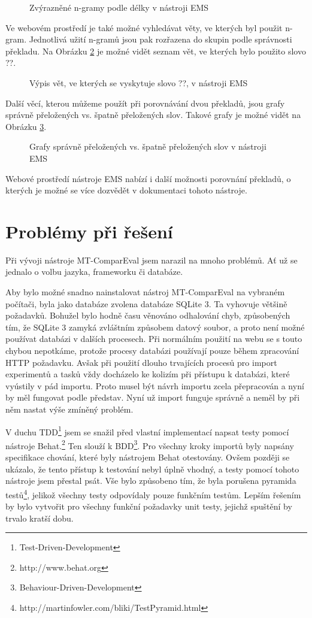 \begin{figure}
  \caption{Zvýrazněné n-gramy podle délky v nástroji EMS}
  \label{img:ems-sentence}
\end{figure}

Ve webovém prostředí je také možné vyhledávat věty,
  ve kterých byl použit n-gram.
Jednotlivá užití n-gramů jsou pak rozřazena do skupin podle správnosti překladu.
Na Obrázku \ref{img:ems-word} je možné vidět seznam vět,
  ve kterých bylo použito slovo ??.

\begin{figure}
  \caption{Výpis vět, ve kterých se vyskytuje slovo ??, v nástroji EMS}
  \label{img:ems-word}
\end{figure}

Další věcí, kterou můžeme použít při porovnávání dvou překladů,
  jsou grafy správně přeložených vs. špatně přeložených slov.
Takové grafy je možné vidět na Obrázku \ref{img:ems-charts}.

\begin{figure}
  \caption{Grafy správně přeložených vs. špatně přeložených slov v nástroji EMS}
  \label{img:ems-charts}
\end{figure}

Webové prostředí nástroje EMS nabízí i další možnosti porovnání překladů,
  o kterých je možné se více dozvědět v dokumentaci tohoto nástroje.

\section{Problémy při řešení}
Při vývoji nástroje MT-ComparEval jsem narazil na mnoho problémů.
Ať už se jednalo o volbu jazyka, frameworku či databáze.

Aby bylo možné snadno nainstalovat nástroj MT-ComparEval na vybraném počítači,
  byla jako databáze zvolena databáze SQLite 3.
Ta vyhovuje většině požadavků.
Bohužel bylo hodně času věnováno odhalování chyb,
  způsobených tím,
  že SQLite 3 zamyká zvláštním způsobem datový soubor,
  a proto není možné používat databázi v dalších procesech.
Při normálním použití na webu se s touto chybou nepotkáme,
  protože procesy databázi používají pouze během zpracování HTTP požadavku.
Avšak při použití dlouho trvajících procesů pro import experimentů a tasků
  vždy docházelo ke kolizím při přístupu k databázi,
  které vyústily v pád importu.
Proto musel být návrh importu zcela přepracován a nyní by měl fungovat podle představ.
Nyní už import funguje správně a neměl by při něm nastat výše zmíněný problém.


V duchu TDD\footnote{Test-Driven-Development}
  jsem se snažil před vlastní implementací napsat testy pomocí nástroje Behat.\footnote{http://www.behat.org}
Ten slouží k BDD\footnote{Behaviour-Driven-Development}.
Pro všechny kroky importů byly napsány specifikace chování, které byly nástrojem Behat otestovány.
Ovšem později se ukázalo, že tento přístup k testování nebyl úplně vhodný, a testy pomocí tohoto nástroje jsem přestal psát.
Vše bylo způsobeno tím, že byla porušena pyramida testů\footnote{http://martinfowler.com/bliki/TestPyramid.html},
  jelikož všechny testy odpovídaly pouze funkčním testům.
Lepším řešením by bylo vytvořit pro všechny funkční požadavky unit testy,
  jejichž spuštění by trvalo kratší dobu.
